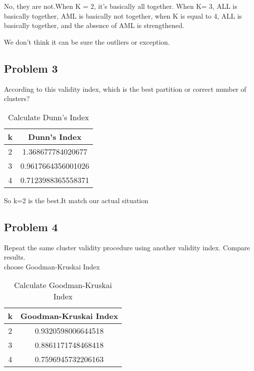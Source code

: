 \documentclass[a4pper,11pt,onecolumn]{article}
\begin{document}
No, they are not.When K = 2, it's basically all together. When K= 3, ALL is basically together, AML is basically not together, when K is equal to 4, ALL is basically together, and the absence of AML is strengthened.

We don't think it can be sure the outliers or exception.

\subsection{Problem 3}

According to this validity index, which is the best partition or correct number of clusters?

\begin{table}[h]  %
	\centering  %
	\caption{Calculate Dunn's Index}  %
	\begin{tabular}{cc}  %
		\hline
		\hline
		k & Dunn's Index \\ [0.5ex] 
		\hline
		 2 & 1.368677784020677   \\
		 3 & 0.9617664356001026 \\
		 4 & 0.7123988365558371  \\
	
		\hline
		\hline
	\end{tabular}
\end{table}

So k=2 is the best.It match our actual situation

\subsection{Problem 4}
Repeat the same cluster validity procedure using another validity index. Compare results.\\

choose Goodman-Kruskai Index

\begin{table}[h]  %
	\centering  %
	\caption{Calculate Goodman-Kruskai Index}  %
	\begin{tabular}{cc}  %
		\hline
		\hline
		k & Goodman-Kruskai Index \\ [0.5ex] 
		\hline
		2 & 0.9320598006644518   \\
		3 & 0.8861171748468418 \\
		4 & 0.7596945732206163  \\
		
		\hline
		\hline
	\end{tabular}
\end{table}
\end{document}
